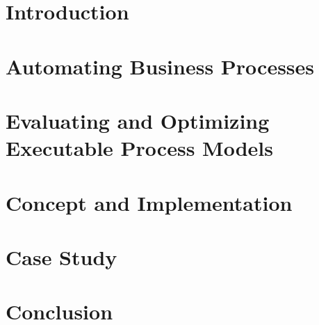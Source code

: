\documentclass[draft,final]{vutinfth} %
\begin{document}


\frontmatter %



\AddStatementPage





\tableofcontents %

\mainmatter

\chapter{Introduction}


\chapter{Automating Business Processes}


\chapter{Evaluating and Optimizing Executable Process Models}


\chapter{Concept and Implementation}


\chapter{Case Study}


\chapter{Conclusion}

\end{document}
